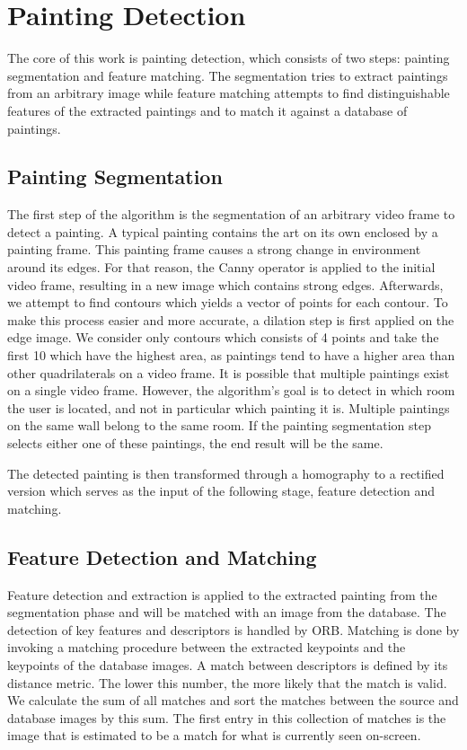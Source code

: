\section{Painting Detection}
\label{sec:painting_detection}




	The core of this work is painting detection, which consists of two steps: painting segmentation and feature matching. The segmentation tries to extract paintings from an arbitrary image while feature matching attempts to find distinguishable features of the extracted paintings and to match it against a database of paintings.

	\subsection{Painting Segmentation}
	The first step of the algorithm is the segmentation of an arbitrary video frame to detect a painting. A typical painting contains the art on its own enclosed by a painting frame. This painting frame causes a strong change in environment around its edges. For that reason, the Canny operator is applied to the initial video frame, resulting in a new image which contains strong edges. Afterwards, we attempt to find contours which yields a vector of points for each contour. To make this process easier and more accurate, a dilation step is first applied on the edge image. We consider only contours which consists of 4 points and take the first 10 which have the highest area, as paintings tend to have a higher area than other quadrilaterals on a video frame. It is possible that multiple paintings exist on a single video frame. However, the algorithm's goal is to detect in which room the user is located, and not in particular which painting it is. Multiple paintings on the same wall belong to the same room. If the painting segmentation step selects either one of these paintings, the end result will be the same. 
	

	The detected painting is then transformed through a homography to a rectified version which serves as the input of the following stage, feature detection and matching.

	\subsection{Feature Detection and Matching}
	Feature detection and extraction is applied to the extracted painting from the segmentation phase and will be matched with an image from the database. The detection of key features and descriptors is handled by ORB. Matching is done by invoking a matching procedure between the extracted keypoints and the keypoints of the database images. A match between descriptors is defined by its distance metric. The lower this number, the more likely that the match is valid. We calculate the sum of all matches and sort the matches between the source and database images by this sum. The first entry in this collection of matches is the image that is estimated to be a match for what is currently seen on-screen. 

